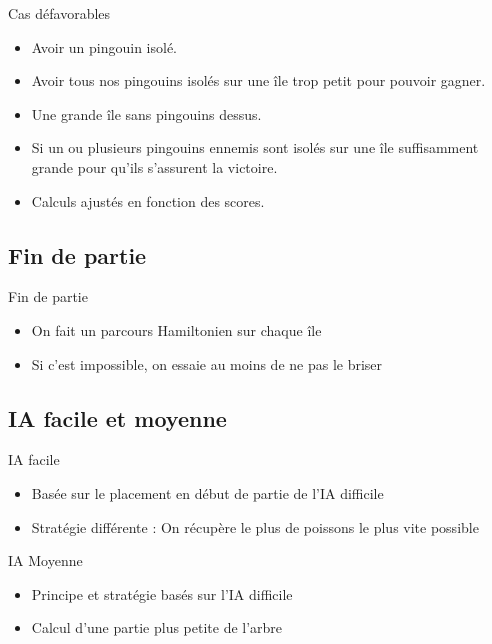 \documentclass{beamer}
\begin{document}
\begin{frame}{}
\begin{block}{Cas défavorables}
\begin{itemize}
 \item<1-> Avoir un pingouin isolé.
 \item<2-> Avoir tous nos pingouins isolés sur une île trop petit pour pouvoir gagner.
 \item<3-> Une grande île sans pingouins dessus.
 \item<4-> Si un ou plusieurs pingouins ennemis sont isolés sur une île suffisamment grande pour qu'ils s'assurent la victoire.
\end{itemize}
\end{block}

\begin{block}{}
\begin{itemize}
\item<5-> Calculs ajustés en fonction des scores.
\end{itemize}
\end{block}

\end{frame}

\subsection{Fin de partie}

\begin{frame}{}
\begin{block}{Fin de partie}
\begin{itemize}
  \item<1->{On fait un parcours Hamiltonien sur chaque île}
  \item<2->{Si c'est impossible, on essaie au moins de ne pas le briser}
\end{itemize}
\end{block}
\end{frame}

\subsection{IA facile et moyenne}
\begin{frame}{}
\begin{block}{IA facile}
\begin{itemize}
  \item<1->{Basée sur le placement en début de partie de l'IA difficile}
  \item<2->{Stratégie différente : On récupère le plus de poissons le plus vite possible}
\end{itemize}
\end{block}
\end{frame}
\begin{frame}{}
\begin{block}{IA Moyenne}
\begin{itemize}
  \item<1->{Principe et stratégie basés sur l'IA difficile}
  \item<2->{Calcul d'une partie plus petite de l'arbre}
\end{itemize}
\end{block}
\end{frame}
\end{document}
